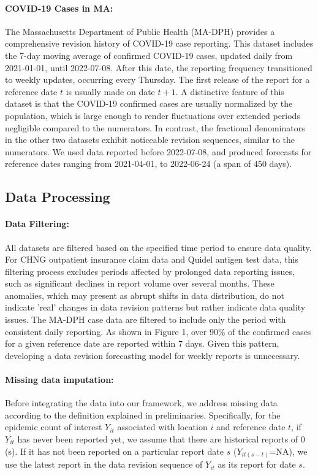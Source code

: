 \paragraph{COVID-19 Cases in MA:}
The Massachusetts Department of Public Health (MA-DPH) provides a comprehensive revision history of COVID-19 case reporting. This dataset includes the 7-day moving average of confirmed COVID-19 cases, updated daily from 2021-01-01, until 2022-07-08. After this date, the reporting frequency transitioned to weekly updates, occurring every Thursday. The first release of the report for a reference date \( t \) is usually made on date \( t+1 \). A distinctive feature of this dataset is that the COVID-19 confirmed cases are usually normalized by the population, which is large enough to render fluctuations over extended periods negligible compared to the numerators. In contrast, the fractional denominators in the other two datasets exhibit noticeable revision sequences, similar to the numerators. We used data reported before 2022-07-08, and produced forecasts for reference dates ranging from 2021-04-01, to 2022-06-24 (a span of 450 days).


\subsection{Data Processing}

\paragraph{Data Filtering:}
All datasets are filtered based on the specified time period to ensure data quality. For CHNG outpatient insurance claim data and Quidel antigen test data, this filtering process excludes periods affected by prolonged data reporting issues, such as significant declines in report volume over several months. These anomalies, which may present as abrupt shifts in data distribution, do not indicate 'real' changes in data revision patterns but rather indicate data quality issues. The MA-DPH case data are filtered to include only the period with consistent daily reporting. As shown in Figure 1, over 90\% of the confirmed cases for a given reference date are reported within 7 days. Given this pattern, developing a data revision forecasting model for weekly reports is unnecessary.

\paragraph{Missing data imputation:}
Before integrating the data into our framework, we address missing data according to the definition explained in preliminaries. Specifically, for the epidemic count of interest $Y_{it}$ associated with location $i$ and reference date $t$, if $Y_{it}$ has never been reported yet, we assume that there are historical reports of 0 (s). If it has not been reported on a particular report date $s$ ($Y_{it(s-t)}$=NA), we use the latest report in the data revision sequence of $Y_{it}$ as its report for date $s$. 

